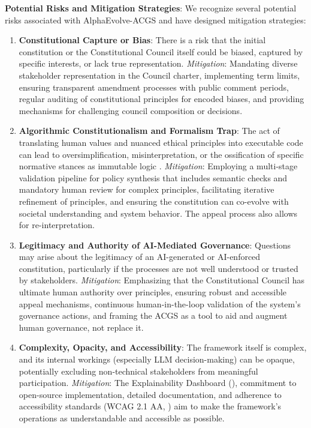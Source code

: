 \documentclass[manuscript,screen,review,anonymous,9pt]{acmart}
\begin{document}
\textbf{Potential Risks and Mitigation Strategies}:
We recognize several potential risks associated with AlphaEvolve-ACGS and have designed mitigation strategies:
\begin{enumerate}[leftmargin=*,itemsep=1pt,parsep=1pt]
    \item \textbf{Constitutional Capture or Bias}: There is a risk that the initial constitution or the Constitutional Council itself could be biased, captured by specific interests, or lack true representation.
        \textit{Mitigation}: Mandating diverse stakeholder representation in the Council charter, implementing term limits, ensuring transparent amendment processes with public comment periods, regular auditing of constitutional principles for encoded biases, and providing mechanisms for challenging council composition or decisions.
    \item \textbf{Algorithmic Constitutionalism and Formalism Trap}: The act of translating human values and nuanced ethical principles into executable code can lead to oversimplification, misinterpretation, or the ossification of specific normative stances as immutable logic \cite{Selbst2019FairnessAccountability}.
        \textit{Mitigation}: Employing a multi-stage validation pipeline for policy synthesis that includes semantic checks and mandatory human review for complex principles, facilitating iterative refinement of principles, and ensuring the constitution can co-evolve with societal understanding and system behavior. The appeal process also allows for re-interpretation.
    \item \textbf{Legitimacy and Authority of AI-Mediated Governance}: Questions may arise about the legitimacy of an AI-generated or AI-enforced constitution, particularly if the processes are not well understood or trusted by stakeholders.
        \textit{Mitigation}: Emphasizing that the Constitutional Council has ultimate human authority over principles, ensuring robust and accessible appeal mechanisms, continuous human-in-the-loop validation of the system's governance actions, and framing the ACGS as a tool to aid and augment human governance, not replace it.
    \item \textbf{Complexity, Opacity, and Accessibility}: The framework itself is complex, and its internal workings (especially LLM decision-making) can be opaque, potentially excluding non-technical stakeholders from meaningful participation.
        \textit{Mitigation}: The Explainability Dashboard (), commitment to open-source implementation, detailed documentation, and adherence to accessibility standards (WCAG 2.1 AA, ) aim to make the framework's operations as understandable and accessible as possible.

\end{enumerate}
\end{document}
